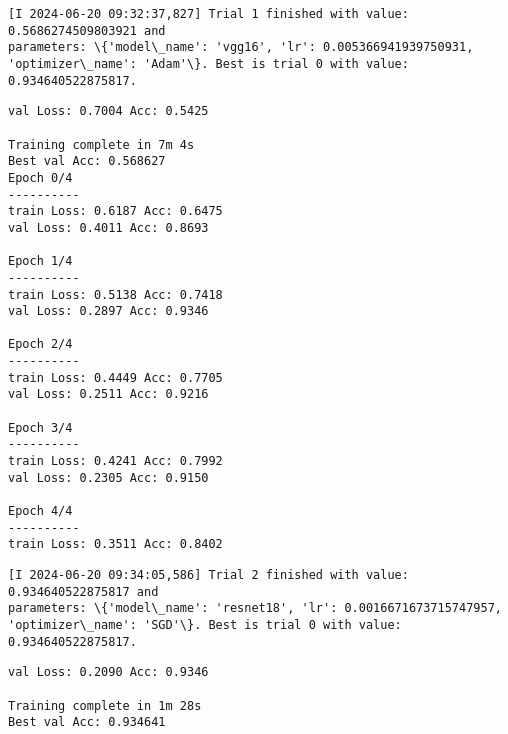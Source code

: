\documentclass[11pt]{article}
\begin{document}
    \begin{Verbatim}[commandchars=\\\{\}]
[I 2024-06-20 09:32:37,827] Trial 1 finished with value: 0.5686274509803921 and
parameters: \{'model\_name': 'vgg16', 'lr': 0.005366941939750931,
'optimizer\_name': 'Adam'\}. Best is trial 0 with value: 0.934640522875817.
    \end{Verbatim}

    \begin{Verbatim}[commandchars=\\\{\}]
val Loss: 0.7004 Acc: 0.5425

Training complete in 7m 4s
Best val Acc: 0.568627
Epoch 0/4
----------
train Loss: 0.6187 Acc: 0.6475
val Loss: 0.4011 Acc: 0.8693

Epoch 1/4
----------
train Loss: 0.5138 Acc: 0.7418
val Loss: 0.2897 Acc: 0.9346

Epoch 2/4
----------
train Loss: 0.4449 Acc: 0.7705
val Loss: 0.2511 Acc: 0.9216

Epoch 3/4
----------
train Loss: 0.4241 Acc: 0.7992
val Loss: 0.2305 Acc: 0.9150

Epoch 4/4
----------
train Loss: 0.3511 Acc: 0.8402
    \end{Verbatim}

    \begin{Verbatim}[commandchars=\\\{\}]
[I 2024-06-20 09:34:05,586] Trial 2 finished with value: 0.934640522875817 and
parameters: \{'model\_name': 'resnet18', 'lr': 0.0016671673715747957,
'optimizer\_name': 'SGD'\}. Best is trial 0 with value: 0.934640522875817.
    \end{Verbatim}

    \begin{Verbatim}[commandchars=\\\{\}]
val Loss: 0.2090 Acc: 0.9346

Training complete in 1m 28s
Best val Acc: 0.934641
    \end{Verbatim}
\end{document}
